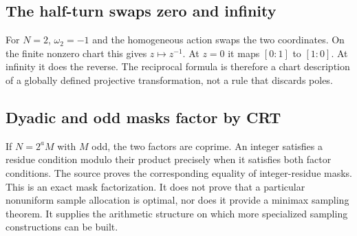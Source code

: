 \subsection{The half-turn swaps zero and infinity}
For $N=2$, $\omega_2=-1$ and the homogeneous action swaps the two coordinates.
On the finite nonzero chart this gives $z\mapsto z^{-1}$. At $z=0$ it maps $[0:1]$ to $[1:0]$. At infinity it does the reverse. The reciprocal formula is therefore a chart description of a globally defined projective transformation, not a rule that discards poles.

\subsection{Dyadic and odd masks factor by CRT}
If $N=2^aM$ with $M$ odd, the two factors are coprime. An integer satisfies a residue condition modulo their product precisely when it satisfies both factor conditions. The source proves the corresponding equality of integer-residue masks.
This is an exact mask factorization. It does not prove that a particular nonuniform sample allocation is optimal, nor does it provide a minimax sampling theorem. It supplies the arithmetic structure on which more specialized sampling constructions can be built.
